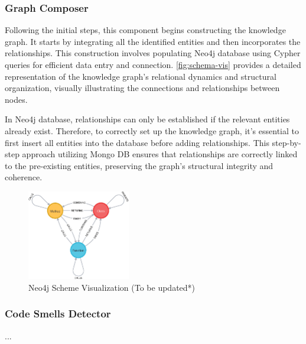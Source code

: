 \subsubsection{Graph Composer}

Following the initial steps, this component begins constructing the knowledge graph. It starts by integrating all the identified entities and then incorporates the relationships. This construction involves populating Neo4j database using Cypher queries for efficient data entry and connection. \autoref{fig:schema-vis} provides a detailed representation of the knowledge graph's relational dynamics and structural organization, visually illustrating the connections and relationships between nodes.

In Neo4j database, relationships can only be established if the relevant entities already exist. Therefore, to correctly set up the knowledge graph, it's essential to first insert all entities into the database before adding relationships. This step-by-step approach utilizing Mongo DB ensures that relationships are correctly linked to the pre-existing entities, preserving the graph's structural integrity and coherence.



\begin{figure}[htbp]
\begin{center}
    \includegraphics[width=0.4\textwidth]{figures/schema-visualization.eps}
\end{center}
\caption{Neo4j Scheme Visualization (To be updated*)}
\label{fig:schema-vis}
\end{figure}


\subsubsection{Code Smells Detector}
...

\newpage
\newpage
\newpage
\newpage
